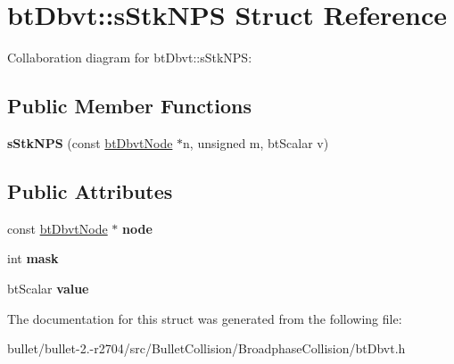 \hypertarget{structbt_dbvt_1_1s_stk_n_p_s}{\section{bt\+Dbvt\+:\+:s\+Stk\+N\+P\+S Struct Reference}
\label{structbt_dbvt_1_1s_stk_n_p_s}
}


Collaboration diagram for bt\+Dbvt\+:\+:s\+Stk\+N\+P\+S\+:
\subsection*{Public Member Functions}
\begin{DoxyCompactItemize}
\item 
\hypertarget{structbt_dbvt_1_1s_stk_n_p_s_af66a65288f97b62b5bd6d7b4cfa3ce6c}{{\bfseries s\+Stk\+N\+P\+S} (const \hyperlink{structbt_dbvt_node}{bt\+Dbvt\+Node} $\ast$n, unsigned m, bt\+Scalar v)}\label{structbt_dbvt_1_1s_stk_n_p_s_af66a65288f97b62b5bd6d7b4cfa3ce6c}

\end{DoxyCompactItemize}
\subsection*{Public Attributes}
\begin{DoxyCompactItemize}
\item 
\hypertarget{structbt_dbvt_1_1s_stk_n_p_s_a253483cec2c2c908dca4b39f4143e4ad}{const \hyperlink{structbt_dbvt_node}{bt\+Dbvt\+Node} $\ast$ {\bfseries node}}\label{structbt_dbvt_1_1s_stk_n_p_s_a253483cec2c2c908dca4b39f4143e4ad}

\item 
\hypertarget{structbt_dbvt_1_1s_stk_n_p_s_a2a0670124f8f596e063b2db5a65fb56e}{int {\bfseries mask}}\label{structbt_dbvt_1_1s_stk_n_p_s_a2a0670124f8f596e063b2db5a65fb56e}

\item 
\hypertarget{structbt_dbvt_1_1s_stk_n_p_s_a28a1b65c341ae1bbfb435708d4001a90}{bt\+Scalar {\bfseries value}}\label{structbt_dbvt_1_1s_stk_n_p_s_a28a1b65c341ae1bbfb435708d4001a90}

\end{DoxyCompactItemize}


The documentation for this struct was generated from the following file\+:\begin{DoxyCompactItemize}
\item 
bullet/bullet-\/2.-\/r2704/src/\+Bullet\+Collision/\+Broadphase\+Collision/bt\+Dbvt.\+h\end{DoxyCompactItemize}
